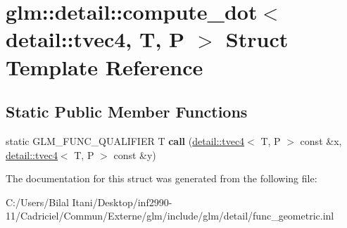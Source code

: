\hypertarget{structglm_1_1detail_1_1compute__dot_3_01detail_1_1tvec4_00_01_t_00_01_p_01_4}{}\section{glm\+:\+:detail\+:\+:compute\+\_\+dot$<$ detail\+:\+:tvec4, T, P $>$ Struct Template Reference}
\label{structglm_1_1detail_1_1compute__dot_3_01detail_1_1tvec4_00_01_t_00_01_p_01_4}
\subsection*{Static Public Member Functions}
\begin{DoxyCompactItemize}
\item 
static G\+L\+M\+\_\+\+F\+U\+N\+C\+\_\+\+Q\+U\+A\+L\+I\+F\+I\+ER T {\bfseries call} (\hyperlink{structglm_1_1detail_1_1tvec4}{detail\+::tvec4}$<$ T, P $>$ const \&x, \hyperlink{structglm_1_1detail_1_1tvec4}{detail\+::tvec4}$<$ T, P $>$ const \&y)\hypertarget{structglm_1_1detail_1_1compute__dot_3_01detail_1_1tvec4_00_01_t_00_01_p_01_4_acc311c73135c616fd126c216454759e2}{}\label{structglm_1_1detail_1_1compute__dot_3_01detail_1_1tvec4_00_01_t_00_01_p_01_4_acc311c73135c616fd126c216454759e2}

\end{DoxyCompactItemize}


The documentation for this struct was generated from the following file\+:\begin{DoxyCompactItemize}
\item 
C\+:/\+Users/\+Bilal Itani/\+Desktop/inf2990-\/11/\+Cadriciel/\+Commun/\+Externe/glm/include/glm/detail/func\+\_\+geometric.\+inl\end{DoxyCompactItemize}
